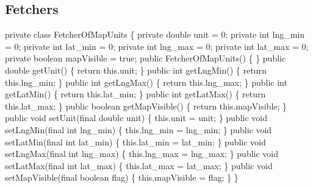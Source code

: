 \subsection{Fetchers}
\nwenddocs{}\plusendmoddef
private class FetcherOfMapUnits \{
  private double unit = 0;
  private int lng_min = 0;
  private int lat_min = 0;
  private int lng_max = 0;
  private int lat_max = 0;
  private boolean mapVisible = true;
  public FetcherOfMapUnits() \{ \}
  public double getUnit() \{
    return this.unit;
  \}
  public int getLngMin() \{
    return this.lng_min;
  \}
  public int getLngMax() \{
    return this.lng_max;
  \}
  public int getLatMin() \{
    return this.lat_min;
  \}
  public int getLatMax() \{
    return this.lat_max;
  \}
  public boolean getMapVisible() \{
    return this.mapVisible;
  \}
  public void setUnit(final double unit) \{
    this.unit = unit;
  \}
  public void setLngMin(final int lng_min) \{
    this.lng_min = lng_min;
  \}
  public void setLatMin(final int lat_min) \{
    this.lat_min = lat_min;
  \}
  public void setLngMax(final int lng_max) \{
    this.lng_max = lng_max;
  \}
  public void setLatMax(final int lat_max) \{
    this.lat_max = lat_max;
  \}
  public void setMapVisible(final boolean flag) \{
    this.mapVisible = flag;
  \}
\}
\nwendcode{}\nwdocspar

